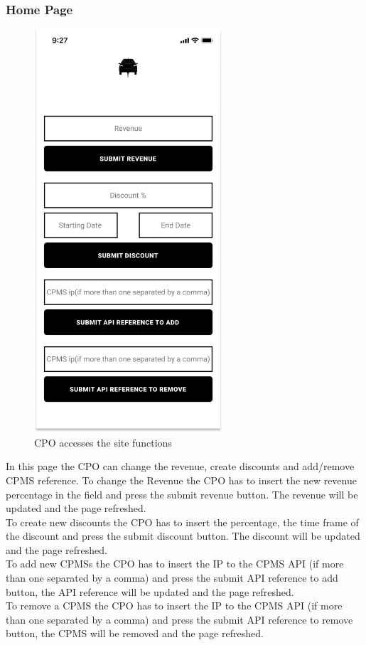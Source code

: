 \subsubsection{Home Page}
\begin{figure}[H]
    \centering
    \includegraphics[keepaspectratio, height=15cm]{Mockup/CPOAppInterface/Homepage.png}
    \caption{\ac{CPO} accesses the site functions}
    \label{site:Homepage}
\end{figure}
In this page the \ac{CPO} can change the revenue, create discounts and add/remove \ac{CPMS} reference.
To change the Revenue the \ac{CPO} has to insert the new revenue percentage in the field and press the submit revenue button. The revenue will be updated and the page refreshed.\\
To create new discounts the \ac{CPO} has to insert the percentage, the time frame of the discount and press the submit discount button. The discount will be updated and the page refreshed.\\
To add new \acp{CPMS} the \ac{CPO} has to insert the IP to the \ac{CPMS} \ac{API} (if more than one separated by a comma) and press the submit \ac{API} reference to add button, the \ac{API} reference will be updated and the page refreshed.\\
To remove a \ac{CPMS} the \ac{CPO} has to insert the IP to the \ac{CPMS} \ac{API} (if more than one separated by a comma) and press the submit \ac{API} reference to remove button, the \ac{CPMS} will be removed and the page refreshed.

